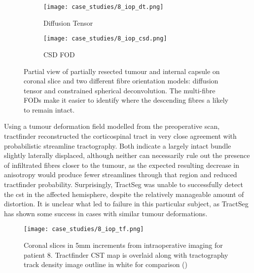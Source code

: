 \begin{figure}
  \centering
  \begin{subfigure}{0.3\textwidth}
    \centering
    \texttt{[image: case\_studies/8\_iop\_dt.png]}
    \caption{Diffusion Tensor}
    \label{fig:8i_dt}
  \end{subfigure}%
  \begin{subfigure}{0.3\textwidth}
    \centering
    \texttt{[image: case\_studies/8\_iop\_csd.png]}
    \caption{CSD FOD}
    \label{fig:8i_csd}
  \end{subfigure}%
  \caption{Partial view of partially resected tumour and internal capsule on coronal slice and two different fibre orientation models: diffusion tensor and constrained spherical deconvolution. The multi-fibre FODs make it easier to identify where the descending fibres a likely to remain intact. }
  \label{fig:8i_fod}
\end{figure}

Using a tumour deformation field modelled from the preoperative scan, tractfinder reconstructed the corticospinal tract in very close agreement with probabilistic streamline tractography.
Both indicate a largely intact bundle slightly laterally displaced, although neither can necessarily rule out the presence of infiltrated fibres closer to the tumour, as the expected resulting decrease in anisotropy would produce fewer streamlines through that region and reduced tractfinder probability.
Surprisingly, TractSeg was unable to successfully detect the \gls{cst} in the affected hemisphere, despite the relatively manageable amount of distortion.
It is unclear what led to failure in this particular subject, as TractSeg has shown some success in cases with similar tumour deformations\autocite{Moshe2022}.

\begin{figure}
  \texttt{[image: case\_studies/8\_iop\_tf.png]}
  \caption{Coronal slices in 5mm increments from intraoperative imaging for patient 8. Tractfinder CST map is overlaid along with tractography track density image outline in white for comparison ()}
  \label{fig:8i_tf}
\end{figure}
